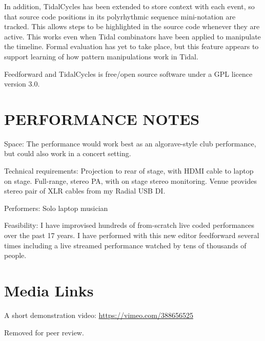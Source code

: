 \documentclass{nimemusic}
\begin{document}
In addition, TidalCycles has been extended to store context with each
event, so that source code positions in its polyrhythmic sequence
mini-notation are tracked. This allows steps to be highlighted in the
source code whenever they are active. This works even when Tidal
combinators have been applied to manipulate the timeline. Formal
evaluation has yet to take place, but this feature appears to support
learning of how pattern manipulations work in Tidal.

Feedforward and TidalCycles is free/open source software under a GPL
licence version 3.0.

\section{PERFORMANCE NOTES}

Space: The performance would work best as an algorave-style club
performance, but could also work in a concert setting.

Technical requirements: Projection to rear of stage, with HDMI cable
to laptop on stage. Full-range, stereo PA, with on stage stereo
monitoring. Venue provides stereo pair of XLR cables from my Radial
USB DI.

Performers: Solo laptop musician

Feasibility: I have improvised hundreds of from-scratch live coded
performances over the past 17 years. I have performed with this new
editor feedforward several times including a live streamed performance
watched by tens of thousands of people.

\section{Media Links}

A short demonstration video: \url{https://vimeo.com/388656525}

\begin{acks}
Removed for peer review.
\end{acks}

\end{document}
